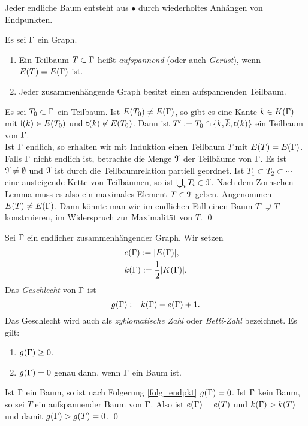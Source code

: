 \FOLG \label{folg_endpkt}
Jeder endliche Baum entsteht aus $\bullet$ durch wiederholtes
Anhängen von Endpunkten.

\DB Es sei $\Gamma$ ein Graph.
\begin{enumerate}
\item Ein Teilbaum $T\subset \Gamma$ heißt \emph{aufspannend}
(oder auch \emph{Gerüst}), wenn $E(T)=E(\Gamma)$ ist.
\item Jeder zusammenhängende Graph besitzt einen aufspannenden
Teilbaum.
\end{enumerate}
\bew
Es sei $T_0\subset \Gamma$ ein Teilbaum. Ist $E(T_0)\neq E(\Gamma)$,
so gibt es eine Kante $k\in K(\Gamma)$ mit
$\mathsf{i}(k)\in E(T_0)$ und $\mathsf{t}(k)\not\in E(T_0)$.
Dann ist $T' := T_0\cap\{k,\overline{k},\mathsf{t}(k)\}$ ein Teilbaum von
$\Gamma$.\\
Ist $\Gamma$ endlich, so erhalten wir mit Induktion einen
Teilbaum $T$ mit $E(T)=E(\Gamma)$.\\
Falls $\Gamma$ nicht endlich ist, betrachte die Menge $\mathcal{T}$ der
Teilbäume von $\Gamma$. Es ist $\mathcal{T}\neq\emptyset$ und $\mathcal{T}$
ist durch die Teilbaumrelation partiell geordnet.
Ist $T_1\subset T_2\subset \cdots$ eine austeigende Kette von
Teilbäumen, so ist $\bigcup_i T_i \in \mathcal{T}$.
Nach dem Zornschen Lemma muss es also ein maximales Element
$T\in \mathcal{T}$ geben.
Angenommen $E(T)\neq E(\Gamma)$. Dann könnte man wie im endlichen Fall
einen Baum $T'\supsetneq T$ konstruieren, im Widerspruch zur
Maximalität von $T$.
\qed

\DB \label{bem_geschlecht}
Sei $\Gamma$ ein endlicher zusammenhängender Graph.
Wir setzen
\begin{align*}
&e(\Gamma) := |E(\Gamma)|,\\
&k(\Gamma) := \frac{1}{2}|K(\Gamma)|.
\end{align*}
Das \emph{Geschlecht} von $\Gamma$ ist
\[
g(\Gamma) := k(\Gamma) - e(\Gamma) + 1.
\]
Das Geschlecht wird auch als \emph{zyklomatische Zahl}
oder \emph{Betti-Zahl}
bezeichnet.
Es gilt:
\begin{enumerate}
\item $g(\Gamma) \geq 0$.
\item $g(\Gamma) = 0$ genau dann, wenn $\Gamma$ ein Baum ist.
\end{enumerate}
\bew Ist $\Gamma$ ein Baum, so ist nach Folgerung \ref{folg_endpkt}
$g(\Gamma)=0$. Ist $\Gamma$ kein Baum, so sei $T$ ein aufspannender Baum
von $\Gamma$. Also ist $e(\Gamma)=e(T)$ und $k(\Gamma)>k(T)$ und damit
$g(\Gamma)>g(T)=0$.
\qed

